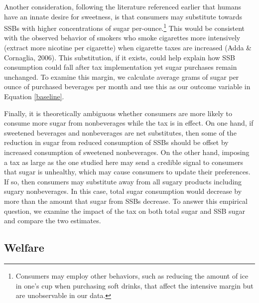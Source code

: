 \documentclass[12pt]{article}
\begin{document}
Another consideration, following the literature referenced earlier that humans have an innate desire for sweetness, is that consumers may substitute towards SSBs with higher concentrations of sugar per-ounce.\footnote{Consumers may employ other behaviors, such as reducing the amount of ice in one's cup when purchasing soft drinks, that affect the intensive margin but are unobservable in our data.} This would be consistent with the observed behavior of smokers who smoke cigarettes more intensively (extract more nicotine per cigarette) when cigarette taxes are increased (Adda \& Cornaglia, 2006). This substitution, if it exists, could help explain how SSB consumption could fall after tax implementation yet sugar purchases remain unchanged. To examine this margin, we calculate average grams of sugar per ounce of purchased beverages per month and use this as our outcome variable in Equation \ref{baseline}.

Finally, it is theoretically ambiguous whether consumers are more likely to consume more sugar from nonbeverages while the tax is in effect. On one hand, if sweetened beverages and nonbeverages are net substitutes, then some of the reduction in sugar from reduced consumption of SSBs should be offset by increased consumption of sweetened nonbeverages. On the other hand, imposing a tax as large as the one studied here may send a credible signal to consumers that sugar is unhealthy, which may cause consumers to update their preferences. If so, then consumers may substitute away from all sugary products including sugary nonbeverages. In this case, total sugar consumption would decrease by more than the amount that sugar from SSBs decrease. To answer this empirical question, we examine the impact of the tax on both total sugar and SSB sugar and compare the two estimates.

\subsection{Welfare}
\end{document}
